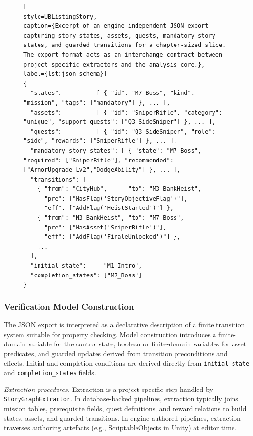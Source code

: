 \documentclass[conference]{IEEEtran}
\begin{document}
\begin{figure}[htbp]
\begin{lstlisting}[
style=UBListingStory,
caption={Excerpt of an engine-independent JSON export capturing story states, assets, quests, mandatory story states, and guarded transitions for a chapter-sized slice. The export format acts as an interchange contract between project-specific extractors and the analysis core.},
label={lst:json-schema}]
{
  "states":          [ { "id": "M7_Boss", "kind": "mission", "tags": ["mandatory"] }, ... ],
  "assets":          [ { "id": "SniperRifle", "category": "unique", "support_quests": ["Q3_SideSniper"] }, ... ],
  "quests":          [ { "id": "Q3_SideSniper", "role": "side", "rewards": ["SniperRifle"] }, ... ],
  "mandatory_story_states": [ { "state": "M7_Boss", "required": ["SniperRifle"], "recommended": ["ArmorUpgrade_Lv2","DodgeAbility"] }, ... ],
  "transitions": [
    { "from": "CityHub",      "to": "M3_BankHeist",
      "pre": ["HasFlag('StoryObjectiveFlag')"],
      "eff": ["AddFlag('HeistStarted')"] },
    { "from": "M3_BankHeist", "to": "M7_Boss",
      "pre": ["HasAsset('SniperRifle')"],
      "eff": ["AddFlag('FinaleUnlocked')"] },
    ...
  ],
  "initial_state":     "M1_Intro",
  "completion_states": ["M7_Boss"]
}
\end{lstlisting}
\end{figure}

\subsubsection{Verification Model Construction}
\label{sec:json-to-model}

The JSON export is interpreted as a declarative description of a finite
transition system suitable for property checking. Model construction
introduces a finite-domain variable for the control state, boolean or
finite-domain variables for asset predicates, and guarded updates derived
from transition preconditions and effects. Initial and completion
conditions are derived directly from \texttt{initial\_state} and
\texttt{completion\_states} fields.

\noindent\emph{Extraction procedures.}
Extraction is a project-specific step handled by
\texttt{StoryGraphExtractor}. In database-backed pipelines, extraction
typically joins mission tables, prerequisite fields, quest definitions,
and reward relations to build states, assets, and guarded transitions.
In engine-authored pipelines, extraction traverses authoring artefacts
(e.g., ScriptableObjects in Unity) at editor time.
\end{document}
